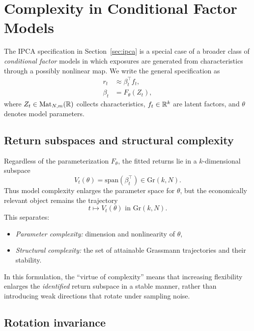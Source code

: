 \documentclass[twoside,11pt,letter]{article}
\begin{document}
\section{Complexity in Conditional Factor Models}
\label{sec:complexity}

The IPCA specification in Section~\ref{sec:ipca} is a special case of a broader class of \emph{conditional factor} models in which exposures are generated from characteristics through a possibly nonlinear map. We write the general specification as
\begin{equation}
\label{eq:general-exposure-map}
\begin{split}
r_t &\approx \beta_t^\top f_t,\\
\beta_t &= F_\theta(Z_t),
\end{split}
\end{equation}
where $Z_t\in \mathrm{Mat}_{N,m}(\mathbb{R})$ collects characteristics, $f_t\in\mathbb{R}^k$ are latent factors, and $\theta$ denotes model parameters.

\subsection{Return subspaces and structural complexity}

Regardless of the parameterization $F_\theta$, the fitted returns lie in a $k$-dimensional subspace
\begin{equation}
V_t(\theta)=\mathrm{span}(\beta_t^\top)\in \mathrm{Gr}(k,N).
\end{equation}
Thus model complexity enlarges the parameter space for $\theta$, but the economically relevant object remains the trajectory
\begin{equation*}
t \longmapsto V_t(\theta) \text{ in } \mathrm{Gr}(k,N).
\end{equation*}
This separates:
\begin{itemize}
\item[(A)] \emph{Parameter complexity:} dimension and nonlinearity of $\theta$,
\item[(B)] \emph{Structural complexity:} the set of attainable Grassmann trajectories and their stability.
\end{itemize}

In this formulation, the ``virtue of complexity'' means that increasing flexibility enlarges the \emph{identified} return subspace in a stable manner, rather than introducing weak directions that rotate under sampling noise.

\subsection{Rotation invariance}
\end{document}

